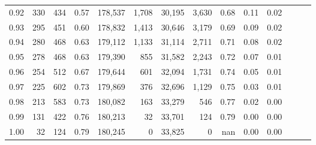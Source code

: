 \begin{tabular}{rrrrrrrrrrrrrr}
0.92 &    330 &  434 &  0.57 &  178,537 &    1,708 &  30,195 &   3,630 &  0.68 &  0.11 &      0.02 \\
0.93 &    295 &  451 &  0.60 &  178,832 &    1,413 &  30,646 &   3,179 &  0.69 &  0.09 &      0.02 \\
0.94 &    280 &  468 &  0.63 &  179,112 &    1,133 &  31,114 &   2,711 &  0.71 &  0.08 &      0.02 \\
0.95 &    278 &  468 &  0.63 &  179,390 &      855 &  31,582 &   2,243 &  0.72 &  0.07 &      0.01 \\
0.96 &    254 &  512 &  0.67 &  179,644 &      601 &  32,094 &   1,731 &  0.74 &  0.05 &      0.01 \\
0.97 &    225 &  602 &  0.73 &  179,869 &      376 &  32,696 &   1,129 &  0.75 &  0.03 &      0.01 \\
0.98 &    213 &  583 &  0.73 &  180,082 &      163 &  33,279 &     546 &  0.77 &  0.02 &      0.00 \\
0.99 &    131 &  422 &  0.76 &  180,213 &       32 &  33,701 &     124 &  0.79 &  0.00 &      0.00 \\
1.00 &     32 &  124 &  0.79 &  180,245 &        0 &  33,825 &       0 &   nan &  0.00 &      0.00 \\
\bottomrule
\end{tabular}
